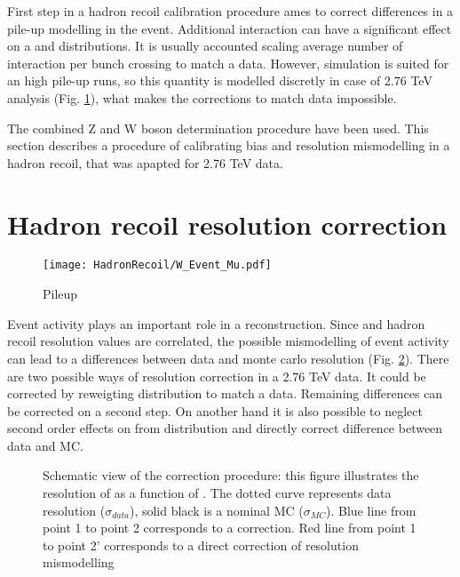  First step in a hadron recoil calibration procedure ames to correct differences in a pile-up modelling in the event. Additional interaction can have a significant effect on a \etmiss and \sumet distributions.   It is usually accounted scaling average number of interaction per bunch crossing to match a data. However, \atlas simulation is suited for an high pile-up runs, so this quantity is modelled discretly in case of 2.76 TeV analysis (Fig. \ref{HadrRecoil:mu}), what makes the corrections to match data impossible. 

The combined Z and W boson determination procedure have been used. This section describes a procedure of calibrating bias and resolution mismodelling in a hadron recoil, that was apapted for 2.76 TeV data. 

\section{Hadron recoil resolution correction}


\begin{figure}[!tbp]
\centering
\texttt{[image: HadronRecoil/W\_Event\_Mu.pdf]}
\caption{Pileup}
\label{HadrRecoil:mu}
\end{figure} 

Event activity plays an important role in a \etmiss reconstruction. Since \sumet and hadron recoil resolution values are correlated, the possible mismodelling of event activity can lead to a differences between data and monte carlo \etmiss resolution (Fig. \ref{ris:sumetCor}). There are two possible ways of resolution correction in a 2.76 TeV data. It could be corrected by reweigting \sumet distribution to match a data. Remaining differences can be corrected on a second step. On another hand it is also possible to neglect second order effects on \etmiss from \sumet distribution and directly correct difference between data and MC. 

\begin{figure}[!tbp]
\begin{center}

\begin{minipage}[h]{0.7\linewidth}
\end{minipage}

\end{center}
\caption{Schematic view of the correction procedure: this figure illustrates the resolution of \uperp as a function of \sumet. The dotted curve represents data resolution ($\sigma_{data}$), solid black is a nominal MC ($\sigma_{MC}$). Blue line from point 1 to point 2 corresponds to a \sumet correction. Red line from point 1 to point 2' corresponds to a direct correction of resolution mismodelling }

\label{ris:sumetCor}
\end{figure}


